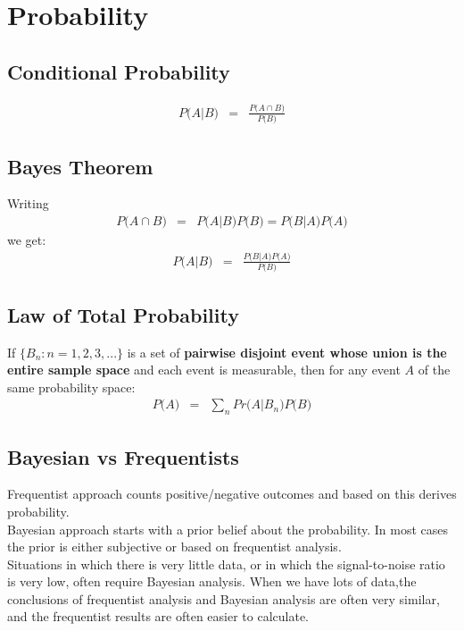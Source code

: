 \chapter{Probability}
\section{Conditional Probability}
\begin{eqnarray}
	P\big(A\bigr\rvert B\big) &=& \frac{P\big(A\cap B\big)}{P\big(B\big)}
\end{eqnarray}

\section{Bayes Theorem}
Writing
\begin{eqnarray}
	P\big(A\cap B\big) &=& P\big(A\bigr\rvert B\big) P\big(B\big) = P\big(B\bigr\rvert A\big) P\big(A\big)
\end{eqnarray}
we get:
\begin{eqnarray}
	P\big(A\bigr\rvert B\big) &=& \frac{P\big(B\bigr\rvert A\big) P\big(A\big)}{P\big(B\big)\label{key}}
\end{eqnarray}

\section{Law of Total Probability}
If $\{B_{n}:n = 1, 2, 3, ...\}$ is a set of \textbf{\color{blue}pairwise disjoint event whose union is the entire sample space} and each event is measurable, then for any event $A$ of the same probability space:
\begin{eqnarray}
	P\big(A\big) &=& \sum_{n}Pr\big(A\bigr\rvert B_{n}\big)P\big(B\big)
\end{eqnarray}

\section{Bayesian vs Frequentists}
Frequentist approach counts positive/negative outcomes and based on this derives probability.\\
Bayesian approach starts with a prior belief about the probability. In most cases the prior is either subjective or based on frequentist analysis.\\
Situations in which there is very little data, or in which the signal-to-noise ratio is very low, often require Bayesian analysis. When we have lots of data,the conclusions of frequentist analysis and Bayesian analysis are often very similar, and the frequentist results are often easier to calculate.